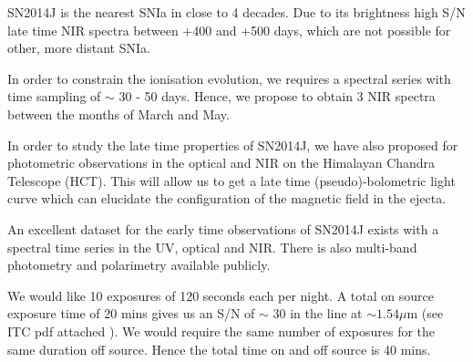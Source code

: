 \documentclass[11pt]{article}
\begin{document}

%

\expdesign    %
SN2014J is the nearest SNIa in close to 4 decades. Due to its brightness  high S/N late time NIR spectra between +400 and +500 days, which are not possible for other, more distant SNIa.

In order to constrain the ionisation evolution, we requires a spectral series with time sampling of $\sim$ 30 - 50 days. Hence, we propose to obtain 3 NIR spectra between the months of March and May. 

In order to study the late time properties of SN2014J, we have also proposed for photometric observations in the optical and NIR on the Himalayan Chandra Telescope (HCT). This will allow us to get a late time (pseudo)-bolometric light curve which can elucidate the configuration of the magnetic field in the ejecta. 

An excellent dataset for the early time observations of SN2014J exists with a spectral time series in the UV, optical and NIR. There is also multi-band photometry and polarimetry available publicly. 

%

\technicaldescription    %
We would like 10 exposures of 120 seconds  each per night. A total on source exposure time of 20 mins  gives us an S/N of $\sim$ 30 in the line at $\sim 1.54 \mu$m (see ITC pdf attached ). 
We would require the same number of exposures for the same duration off source. Hence the total time on and off source is 40 mins. 
\end{document}
